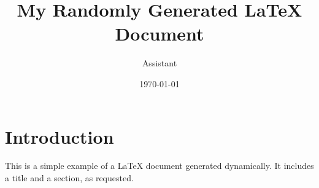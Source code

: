\documentclass{article}
\title{My Randomly Generated LaTeX Document}
\author{Assistant}
\date{\today}
\begin{document}
\maketitle

\section{Introduction}
This is a simple example of a LaTeX document generated dynamically. It includes a title and a section, as requested.
\end{document}
